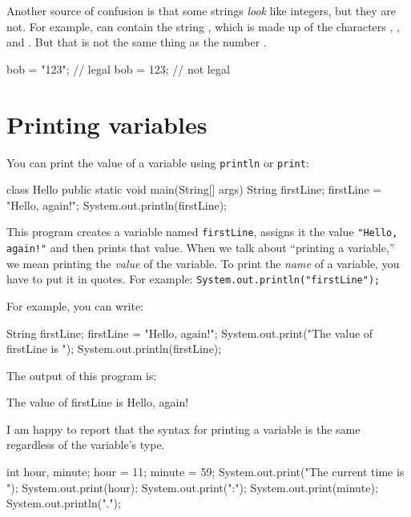 Another source of confusion is that some strings {\em look} like integers, but they are not.
For example,  can contain the string , which is made up of the characters , , and .
But that is not the same thing as the number .

\begin{code}
    bob = "123";  // legal
    bob = 123;    // not legal
\end{code}




\section{Printing variables}
\label{printing}

You can print the value of a variable using {\tt println} or {\tt print}:

\begin{code}
class Hello {
  public static void main(String[] args) {
    String firstLine;
    firstLine = "Hello, again!";
    System.out.println(firstLine);
  }
}
\end{code}

This program creates a variable named {\tt firstLine}, assigns it the value {\tt "Hello, again!"} and then prints that value.
When we talk about ``printing a variable,'' we mean printing the {\em value} of the variable.
To print the {\em name} of a variable, you have to put it in quotes.
For example: {\tt System.out.println("firstLine");}

For example, you can write:

\begin{code}
    String firstLine;
    firstLine = "Hello, again!";
    System.out.print("The value of firstLine is ");
    System.out.println(firstLine);
\end{code}

The output of this program is:

\begin{stdout}
The value of firstLine is Hello, again!
\end{stdout}

I am happy to report that the syntax for printing a variable is the same regardless of the variable's type.

\begin{code}
    int hour, minute;
    hour = 11;
    minute = 59;
    System.out.print("The current time is ");
    System.out.print(hour);
    System.out.print(":");
    System.out.print(minute);
    System.out.println(".");
\end{code}

